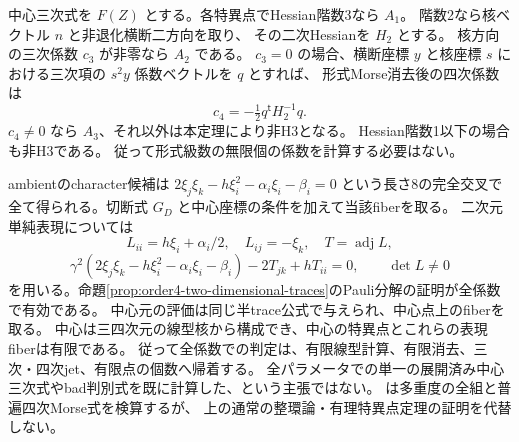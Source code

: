 \begin{remark}[判定に必要な微分と表現方程式は有限である]
中心三次式を $F(Z)$ とする。各特異点でHessian階数3なら $A_1$。
階数2なら核ベクトル $n$ と非退化横断二方向を取り、
その二次Hessianを $H_2$ とする。
核方向の三次係数 $c_3$ が非零なら $A_2$ である。
$c_3=0$ の場合、横断座標 $y$ と核座標 $s$ における三次項の $s^2y$ 係数ベクトルを $q$ とすれば、
形式Morse消去後の四次係数は
\[
 c_4=-\tfrac12 q^{\mathsf t}H_2^{-1}q.
\]
$c_4\ne0$ なら $A_3$、それ以外は本定理により非H3となる。
Hessian階数1以下の場合も非H3である。
従って形式級数の無限個の係数を計算する必要はない。

ambientのcharacter候補は $2\xi_j\xi_k-h\xi_i^2-\alpha_i\xi_i-\beta_i=0$ という長さ8の完全交叉で全て得られる。切断式 $G_D$ と中心座標の条件を加えて当該fiberを取る。
二次元単純表現については
\[
 L_{ii}=h\xi_i+\alpha_i/2,\quad L_{ij}=-\xi_k,\quad T=\operatorname{adj}L,
\]
\[
 \gamma^2(2\xi_j\xi_k-h\xi_i^2-\alpha_i\xi_i-\beta_i)-2T_{jk}+hT_{ii}=0,
 \qquad\det L\ne0
\]
を用いる。命題\ref{prop:order4-two-dimensional-traces}のPauli分解の証明が全係数で有効である。
中心元の評価は同じ半trace公式で与えられ、中心点上のfiberを取る。
中心は三四次元の線型核から構成でき、中心の特異点とこれらの表現fiberは有限である。
従って全係数での判定は、有限線型計算、有限消去、三次・四次jet、有限点の個数へ帰着する。
全パラメータでの単一の展開済み中心三次式やbad判別式を既に計算した、という主張ではない。
 は多重度の全組と普遍四次Morse式を検算するが、
上の通常の整環論・有理特異点定理の証明を代替しない。
\end{remark}
